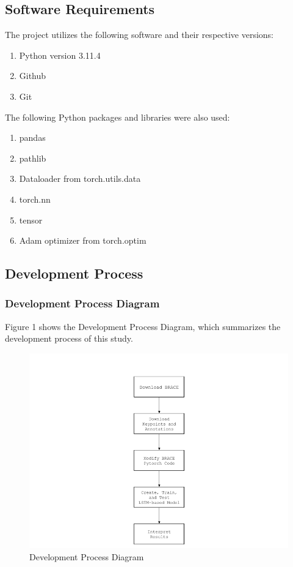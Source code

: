 \documentclass[12pt]{article}
\begin{document}
\subsection{Software Requirements}
    The project utilizes the following software and their respective versions:
\begin{enumerate}
    \item Python version 3.11.4
    \item Github
    \item Git
\end{enumerate}


\noindent The following Python packages and libraries were also used:

\begin{enumerate}
    \item pandas
    \item pathlib
    \item Dataloader from torch.utils.data
    \item torch.nn 
    \item tensor
    \item Adam optimizer from torch.optim
\end{enumerate}

\subsection{Development Process}
\subsubsection{Development Process Diagram}
\par Figure 1 shows the Development Process Diagram, which summarizes the development process of this study. 
\begin{figure}[htbp]
    \includegraphics[width=\linewidth]{dpd.png}
    \caption{Development Process Diagram}
    \label{fig:1}
\end{figure}
\end{document}

